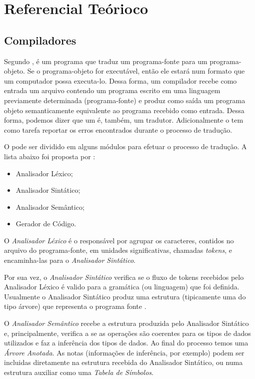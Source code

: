 \section{Referencial Teórioco}
\subsection{Compiladores}
Segundo , \compilador{} é um programa que traduz um
programa-fonte para um programa-objeto. Se o programa-objeto for executável,
então ele estará num formato que um computador possa executa-lo. Dessa forma, um compilador recebe
como entrada um arquivo contendo um programa escrito em uma linguagem previamente
determinada (programa-fonte) e produz como saída um programa objeto semanticamente equivalente
ao programa recebido como entrada. Dessa forma, podemos dizer que um \compilador é,
também, um tradutor. Adicionalmente o \compilador tem como tarefa reportar os
erros encontrados durante o processo de tradução.

O \compilador pode ser dividido em alguns módulos para efetuar o processo de
tradução. A lista abaixo foi proposta por :

\begin{itemize}
	\item Analisador Léxico;
	\item Analisador Sintático;
	\item Analisador Semântico;
	\item Gerador de Código.
\end{itemize}

O \emph{Analisador Léxico} é o responsável por agrupar os caracteres, contidos
no arquivo do programa-fonte, em unidades significativas, chamadas
\emph{tokens}, e encaminha-las para o \emph{Analisador Sintático}.

Por sua vez, o \emph{Analisador Sintático} verifica se o fluxo de tokens
recebidos pelo Analisador Léxico é valido para a gramática (ou linguagem) que
foi definida. Usualmente o Analisador Sintático produz uma estrutura
(tipicamente uma do tipo árvore) que representa o programa fonte
\cite{new-dragon-pt}.

O \emph{Analisador Semântico} recebe a estrutura produzida pelo Analisador
Sintático e, principalmente, verifica a se as operações são coerentes para os
tipos de dados utilizados e faz a inferência dos tipos de dados. Ao final do
processo temos uma \emph{Árvore Anotada}. As notas (informações de inferência,
por exemplo) podem ser incluidas diretamente na estrutura recebida do
Analisador Sintático, ou numa estrutura auxiliar como uma \emph{Tabela de
Símbolos}.

